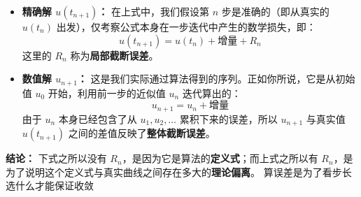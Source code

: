 \begin{itemize}
    \item \textbf{精确解 $u(t_{n+1})$：} 
    在上式中，我们假设第 $n$ 步是准确的（即从真实的 $u(t_n)$ 出发），仅考察公式本身在一步迭代中产生的数学损失，即：
    \[ u(t_{n+1}) = u(t_n) + \text{增量} + R_n \]
    这里的 $R_n$ 称为\textbf{局部截断误差}。

    \item \textbf{数值解 $u_{n+1}$：} 
    这是我们实际通过算法得到的序列。正如你所说，它是从初始值 $u_0$ 开始，利用前一步的近似值 $u_n$ 迭代算出的：
    \[ u_{n+1} = u_n + \text{增量} \]
    由于 $u_n$ 本身已经包含了从 $u_1, u_2, \dots$ 累积下来的误差，所以 $u_{n+1}$ 与真实值 $u(t_{n+1})$ 之间的差值反映了\textbf{整体截断误差}。
\end{itemize}

\noindent \textbf{结论：} 
下式之所以没有 $R_n$，是因为它是算法的\textbf{定义式}；而上式之所以有 $R_n$，是为了说明这个定义式与真实曲线之间存在多大的\textbf{理论偏离}。
算误差是为了看步长选什么才能保证收敛
